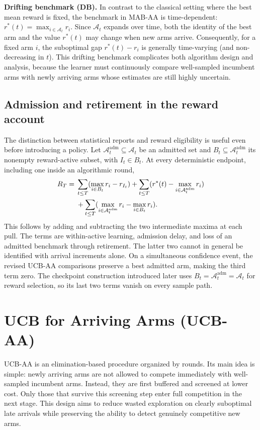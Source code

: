 \documentclass[11pt]{article}
\begin{document}
\textbf{Drifting benchmark (DB).}
In contrast to the classical setting where the best mean reward is fixed, the benchmark in MAB-AA is time-dependent: $r^*(t)=\max_{i\in \mathcal{A}_t} r_i$. Since $\mathcal{A}_t$ expands over time, both the identity of the best arm and the value $r^*(t)$ may change when new arms arrive. Consequently, for a fixed arm $i$, the suboptimal gap $r^*(t)-r_i$ is generally time-varying (and non-decreasing in $t$). This drifting benchmark complicates both algorithm design and analysis, because the learner must continuously compare well-sampled incumbent arms with newly arriving arms whose estimates are still highly uncertain.

\subsection{Admission and retirement in the reward account}

The distinction between statistical reports and reward eligibility is useful
even before introducing a policy. Let $\mathcal{A}^{\mathrm{adm}}_t\subseteq \mathcal{A}_t$ be an admitted set and
$B_t\subseteq \mathcal{A}^{\mathrm{adm}}_t$ its nonempty reward-active subset, with $I_t\in B_t$.
At every deterministic endpoint, including one inside an algorithmic round,
\begin{align}
 R_T={}&\sum_{t\le T}(\max_{i\in B_t}r_i-r_{I_t})
 +\sum_{t\le T}(r^*(t)-\max_{i\in \mathcal{A}^{\mathrm{adm}}_t}r_i)\notag\\
 &+\sum_{t\le T}(\max_{i\in \mathcal{A}^{\mathrm{adm}}_t}r_i-\max_{i\in B_t}r_i).
 \label{eq:three_part}
\end{align}
This follows by adding and subtracting the two intermediate maxima at each
pull. The terms are within-active learning, admission delay, and loss of an
admitted benchmark through retirement. The latter two cannot in general be
identified with arrival increments alone. On a simultaneous confidence event, the revised UCB-AA comparisons preserve
a best admitted arm, making the third term zero. The checkpoint construction
introduced later uses $B_t=\mathcal{A}^{\mathrm{adm}}_t=\mathcal{A}_t$
for reward selection, so its last two terms vanish on every sample path.


\section{UCB for Arriving Arms (UCB-AA)}
\label{sec:algorithm}

UCB-AA is an elimination-based procedure organized by rounds. Its main idea is simple:
newly arriving arms are not allowed to compete immediately with well-sampled incumbent
arms. Instead, they are first buffered and screened at lower cost. Only those that survive
this screening step enter full competition in the next stage. This design aims to reduce
wasted exploration on clearly suboptimal late arrivals while preserving the ability to detect
genuinely competitive new arms.
\end{document}
